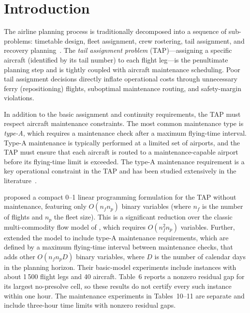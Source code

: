 \section{Introduction}
\label{sec:intro}

The airline planning process is traditionally decomposed into a sequence of
sub-problems: timetable design, fleet assignment, crew rostering, tail
assignment, and recovery planning~\citep{barnhart2003applications,
gopalan1998mathematical}.  The \emph{tail assignment problem} (TAP)—assigning
a specific aircraft (identified by its tail number) to each flight leg—is the
penultimate planning step and is tightly coupled with aircraft maintenance
scheduling.  Poor tail assignment decisions directly inflate operational costs
through unnecessary ferry (repositioning) flights, suboptimal maintenance
routing, and safety-margin violations.

In addition to the basic assignment and continuity requirements, the TAP must
respect aircraft maintenance constraints.  The most common maintenance type is \emph{type-A}, which requires a maintenance check after a maximum flying-time interval.  Type-A maintenance is typically performed at a limited set of
airports, and the TAP must ensure that each aircraft is routed to a maintenance-capable airport before its flying-time limit is exceeded.  The type-A maintenance requirement is a key operational constraint in the TAP and has been studied extensively in the literature~\citep{clarke1997aircraft, barnhart1998flight, gronkvist2005tail}.

\citet{khaled2018compact} proposed a compact 0--1 linear programming
formulation for the TAP without maintenance, featuring only $O(n_f n_p)$ binary variables (where
$n_f$ is the number of flights and $n_p$ the fleet size).  This is a
significant reduction over the classic multi-commodity flow model of
\citet{levin1971scheduling}, which requires $O(n_f^2 n_p)$ variables.
Further, \citet{khaled2018compact} extended the model to include type-A maintenance
requirements, which are defined by a maximum flying-time interval between maintenance checks, that adds other $O(n_f n_p D)$ 
binary variables, where $D$ is the number of calendar days in the planning horizon. 
Their basic-model experiments include instances with about 1\,500 flight legs
and 40 aircraft. Table~6 reports a nonzero residual gap for its largest
no-presolve cell, so these results do not certify every such instance within
one hour. The maintenance experiments in Tables~10--11 are separate and
include three-hour time limits with nonzero residual gaps.


